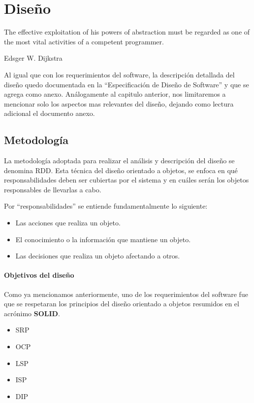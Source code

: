 \chapter{Dise\~no}
\epigraph{The effective exploitation of his powers of abstraction must be
regarded as one of the most vital activities of a competent programmer.}%
{Edsger W. Dijkstra}

Al igual que con los requerimientos del software, la descripci\'on detallada del
dise\~no quedo documentada en la ``Especificaci\'on de Dise\~no de Software'' y
que se agrega como anexo. An\'alogamente al capitulo anterior, nos limitaremos
a mencionar solo los aspectos mas relevantes del dise\~no, dejando como lectura
adicional el documento anexo.

\section{Metodolog\'ia}

La metodolog\'ia adoptada para realizar el an\'alisis y descripci\'on del
dise\~no se denomina \ac{RDD}\cite{Wirfs03}. Esta t\'ecnica del dise\~no
orientado a objetos, se enfoca en qu\'e responsabilidades deben ser
cubiertas por el sistema y en cu\'ales ser\'an los objetos responsables de
llevarlas a cabo.

Por ``responsabilidades'' se entiende fundamentalmente lo siguiente:
\begin{itemize}
 \item Las acciones que realiza un objeto.
 \item El conocimiento o la informaci\'on que mantiene un objeto.
 \item Las decisiones que realiza un objeto afectando a otros.
\end{itemize}

\subsubsection{Objetivos del dise\~no}

Como ya mencionamos anteriormente, uno de los requerimientos del software fue
que se respetaran los principios del dise\~no orientado a objetos resumidos en
el acr\'onimo \textbf{SOLID}\cite{Martin00}.
\begin{itemize}
  \item \ac{SRP}
  \item \ac{OCP}
  \item \ac{LSP}
  \item \ac{ISP}
  \item \ac{DIP}
\end{itemize}

